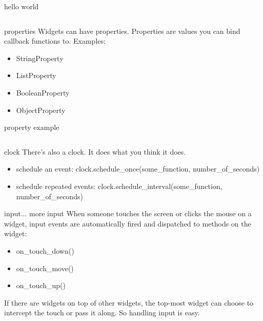 \documentclass{beamer}
\begin{document}
\begin{frame}[fragile]{hello world}
  \inputminted{python}{hello_world.py}
\end{frame}


\begin{frame}{properties}
  Widgets can have properties. Properties are values you can bind callback functions to.
  \pause
  Examples:
    \begin{itemize}
    \item StringProperty
    \pause
    \item ListProperty
    \pause
    \item BooleanProperty
    \pause
    \item ObjectProperty
    \end{itemize}
\end{frame}


\begin{frame}[fragile]{property example}
  \inputminted{python}{property_example.py}
\end{frame}




\begin{frame}{clock}
There's also a clock.
\pause
It does what you think it does.
\pause
\begin{itemize}
  \item schedule an event: clock.schedule\_once(some\_function, number\_of\_seconds)
  \pause
  \item schedule repeated events: clock.schedule\_interval(some\_function, number\_of\_seconds)
  \pause
\end{itemize}
\end{frame}


\begin{frame}{input... more input}
  When someone touches the screen or clicks the mouse on a widget,
  input events are automatically fired and dispatched to methods on
  the widget:
  \pause
  \begin{itemize}
  \item on\_touch\_down()
  \pause
  \item on\_touch\_move()
  \pause
  \item on\_touch\_up()
  \pause
\end{itemize}
If there are widgets on top of other widgets, the top-most widget can
choose to intercept the touch or pass it along.
\pause
So handling input is easy.
\end{frame}
\end{document}
